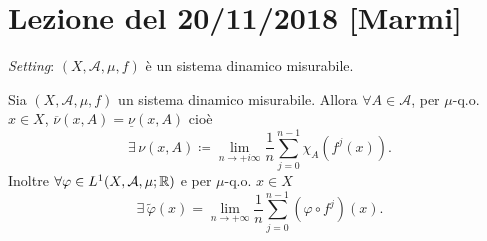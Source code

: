 \section{Lezione del 20/11/2018 [Marmi]}

\emph{Setting}: $ (X, \mathcal{A}, \mu, f) $ è un sistema dinamico misurabile.

\begin{thm}[Birkoff] \label{thm:Birkoff}
    Sia $ (X, \mathcal{A}, \mu, f) $ un sistema dinamico misurabile. Allora $ \forall A \in \mathcal{A} $, per $ \mu $-q.o. $ x \in X $, $ \overline{\nu}(x, A) = \underline{\nu}(x, A) $ cioè
    \[
    \exists \, \nu(x, A) \coloneqq \lim_{n \to +i\infty} \frac{1}{n} \sum_{j = 0}^{n-1} \chi_A(f^{j}(x)).
    \]
    Inoltre $ \forall \varphi \in L^1(X, \mathcal{A}, \mu; \mathbb{R}) $ e per $ \mu $-q.o. $ x \in X $
    \[
    \exists \, \tilde{\varphi}(x) = \lim_{n \to +\infty} \frac{1}{n} \sum_{j=0}^{n-1} (\varphi \circ f^j)(x). 
    \]
\end{thm}

